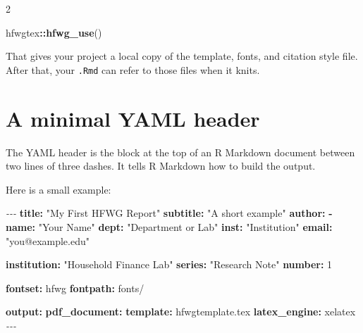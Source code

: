 \documentclass[12pt]{article}
\newenvironment{Shaded}{\begin{snugshade}}{\end{snugshade}}
\newcommand{\AttributeTok}[1]{\textcolor[rgb]{0.13,0.29,0.53}{#1}}
\newcommand{\DecValTok}[1]{\textcolor[rgb]{0.00,0.00,0.81}{#1}}
\newcommand{\FunctionTok}[1]{\textcolor[rgb]{0.13,0.29,0.53}{\textbf{#1}}}
\newcommand{\KeywordTok}[1]{\textcolor[rgb]{0.13,0.29,0.53}{\textbf{#1}}}
\newcommand{\NormalTok}[1]{#1}
\newcommand{\PreprocessorTok}[1]{\textcolor[rgb]{0.56,0.35,0.01}{\textit{#1}}}
\newcommand{\SpecialCharTok}[1]{\textcolor[rgb]{0.81,0.36,0.00}{\textbf{#1}}}
\newcommand{\StringTok}[1]{\textcolor[rgb]{0.31,0.60,0.02}{#1}}
\renewenvironment{Shaded}{%
    \vspace{3pt}%
    \noindent\begin{minipage}{\linewidth}%
    \def\FrameCommand{%
      \hspace{1pt}%
      {\color{hfwgrule}\vrule width 3pt}%
      \hspace{4pt}%
      \colorbox{codeinputbg}%
    }%
    \MakeFramed{\advance\hsize by -\width \FrameRestore}%
    \footnotesize
    \setlength{\parskip}{0pt}%
    \setlength{\partopsep}{0pt}%
  }{%
    \endMakeFramed
    \end{minipage}%
    \vspace{3pt}%
  }
\def\FrameCommand{\fboxsep=4pt\colorbox{codeoutputbg}}%
\begin{document}
\begin{multicols}{2}
\begin{Shaded}
\begin{Highlighting}[]
\NormalTok{hfwgtex}\SpecialCharTok{::}\FunctionTok{hfwg\_use}\NormalTok{()}
\end{Highlighting}
\end{Shaded}

That gives your project a local copy of the template, fonts, and
citation style file. After that, your \texttt{.Rmd} can refer to those
files when it knits.

\section{A minimal YAML header}\label{a-minimal-yaml-header}

The YAML header is the block at the top of an R Markdown document
between two lines of three dashes. It tells R Markdown how to build the
output.

Here is a small example:

\begin{Shaded}
\begin{Highlighting}[]
\PreprocessorTok{{-}{-}{-}}
\FunctionTok{title}\KeywordTok{:}\AttributeTok{ }\StringTok{"My First HFWG Report"}
\FunctionTok{subtitle}\KeywordTok{:}\AttributeTok{ }\StringTok{"A short example"}
\FunctionTok{author}\KeywordTok{:}
\AttributeTok{  }\KeywordTok{{-}}\AttributeTok{ }\FunctionTok{name}\KeywordTok{:}\AttributeTok{ }\StringTok{"Your Name"}
\AttributeTok{    }\FunctionTok{dept}\KeywordTok{:}\AttributeTok{ }\StringTok{"Department or Lab"}
\AttributeTok{    }\FunctionTok{inst}\KeywordTok{:}\AttributeTok{ }\StringTok{"Institution"}
\AttributeTok{    }\FunctionTok{email}\KeywordTok{:}\AttributeTok{ }\StringTok{"you@example.edu"}

\FunctionTok{institution}\KeywordTok{:}\AttributeTok{ }\StringTok{"Household Finance Lab"}
\FunctionTok{series}\KeywordTok{:}\AttributeTok{ }\StringTok{"Research Note"}
\FunctionTok{number}\KeywordTok{:}\AttributeTok{ }\DecValTok{1}

\FunctionTok{fontset}\KeywordTok{:}\AttributeTok{ hfwg}
\FunctionTok{fontpath}\KeywordTok{:}\AttributeTok{ fonts/}

\FunctionTok{output}\KeywordTok{:}
\AttributeTok{  }\FunctionTok{pdf\_document}\KeywordTok{:}
\AttributeTok{    }\FunctionTok{template}\KeywordTok{:}\AttributeTok{ hfwgtemplate.tex}
\AttributeTok{    }\FunctionTok{latex\_engine}\KeywordTok{:}\AttributeTok{ xelatex}
\PreprocessorTok{{-}{-}{-}}
\end{Highlighting}
\end{Shaded}


\end{multicols}
\end{document}
